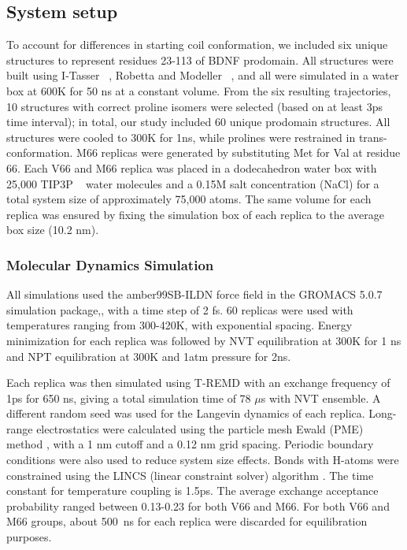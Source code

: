 \documentclass[journal=jacsat,manuscript=article]{achemso}
\begin{document}
\subsection*{System setup} To account for differences in starting coil conformation, we included six unique structures to represent residues 23-113 of BDNF prodomain.  All structures were built using I-Tasser ~\cite{Yang2014,Roy2010,Bioinformatics}, Robetta and Modeller ~\cite{Sali1993a}, and all were simulated in a water box at 600K for 50 ns at a constant volume. From the six resulting trajectories, 10 structures with correct proline isomers were selected (based on at least 3ps time interval); in total, our study included 60 unique prodomain structures. All structures were cooled to 300K for 1ns, while prolines were restrained in trans-conformation. M66 replicas were generated by substituting Met for Val at residue 66. Each V66 and M66 replica was placed in a dodecahedron water box with 25,000 TIP3P ~\cite {Jorgensen1983} water molecules and a 0.15M salt concentration (NaCl) for a total system size of approximately 75,000 atoms. The same volume for each replica was ensured by fixing the simulation box of each replica to the average box size (10.2 nm).

\subsubsection*{Molecular Dynamics Simulation} All simulations used the amber99SB-ILDN force field\cite{Lindorff-Larsen2010a} in the GROMACS 5.0.7 simulation package,\cite{Berendsen1995,Abraham2015}, with a time step of 2 fs. 60 replicas were used with temperatures ranging from 300-420K, with exponential spacing. 
Energy minimization for each replica was followed by NVT equilibration at 300K for 1 ns and NPT equilibration at 300K and 1atm pressure for 2ns. 

Each replica was then simulated using T-REMD \cite{Sugita1999a} with an exchange frequency of 1ps for 650 ns, giving a total simulation time of 78 $\mu$s with NVT ensemble. A different random seed was used for the Langevin dynamics of each replica. Long-range electrostatics were calculated using the particle mesh Ewald (PME) method \cite {Essmann1995}, with a 1 nm cutoff and a 0.12 nm grid spacing. Periodic boundary conditions were also used to reduce system size effects. Bonds with H-atoms were constrained using the LINCS (linear constraint solver) algorithm \cite {Hess1997}. The time constant for temperature coupling is 1.5ps. The average exchange acceptance probability ranged between 0.13-0.23 for both V66 and M66. For both V66 and M66 groups, about 500~ns for each replica were discarded for equilibration purposes. 
\end{document}
